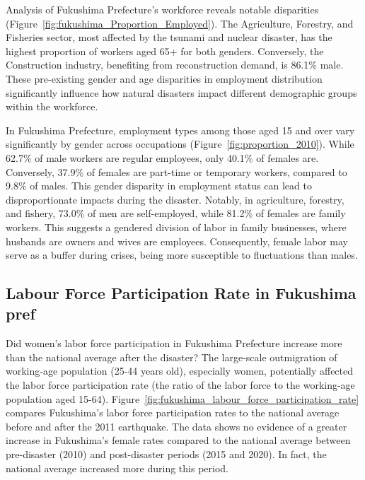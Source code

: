 \documentclass[a4paper,12pt]{article}
\begin{document}

Analysis of Fukushima Prefecture's workforce reveals notable disparities (Figure~\ref{fig:fukushima_Proportion_Employed}). The Agriculture, Forestry, and Fisheries sector, most affected by the tsunami and nuclear disaster, has the highest proportion of workers aged 65+ for both genders. Conversely, the Construction industry, benefiting from reconstruction demand, is 86.1\% male. These pre-existing gender and age disparities in employment distribution significantly influence how natural disasters impact different demographic groups within the workforce.


In Fukushima Prefecture, employment types among those aged 15 and over vary significantly by gender across occupations (Figure~\ref{fig:proportion_2010}). While 62.7\% of male workers are regular employees, only 40.1\% of females are. Conversely, 37.9\% of females are part-time or temporary workers, compared to 9.8\% of males. This gender disparity in employment status can lead to disproportionate impacts during the disaster. Notably, in agriculture, forestry, and fishery, 73.0\% of men are self-employed, while 81.2\% of females are family workers. This suggests a gendered division of labor in family businesses, where husbands are owners and wives are employees. Consequently, female labor may serve as a buffer during crises, being more susceptible to fluctuations than males.






\subsection{Labour Force Participation Rate in Fukushima pref}
\label{sec4.1}


Did women's labor force participation in Fukushima Prefecture increase more than the national average after the disaster?
The large-scale outmigration of working-age population (25-44 years old), especially women, potentially affected the labor force participation rate (the ratio of the labor force to the working-age population aged 15-64). Figure~\ref{fig:fukushima_labour_force_participation_rate} compares Fukushima's labor force participation rates to the national average before and after the 2011 earthquake. The data shows no evidence of a greater increase in Fukushima's female rates compared to the national average between pre-disaster (2010) and post-disaster periods (2015 and 2020). In fact, the national average increased more during this period.
\end{document}
